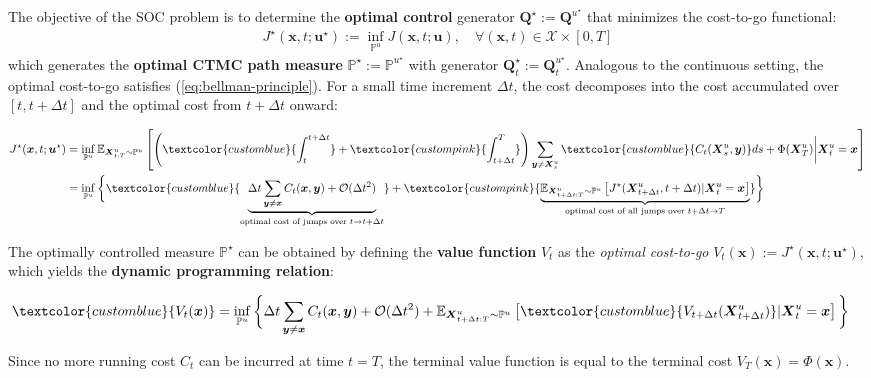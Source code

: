 \documentclass{article}
\newcommand{\boldtext}[1]{\textbf{\textcolor{MyGreen}{#1}}}
\newcommand{\bluetext}[1]{\textcolor{customblue}{#1}}
\newcommand{\pinktext}[1]{\textcolor{custompink}{#1}}
\begin{document}
The objective of the SOC problem is to determine the \boldtext{optimal control} generator $\boldsymbol{Q}^\star:=\boldsymbol{Q}^{u^\star}$ that minimizes the cost-to-go functional:
\begin{align}
    J^\star(\boldsymbol{x},t;\boldsymbol{u}^\star):= \inf_{\mathbb{P}^u}J(\boldsymbol{x},t;\boldsymbol{u}), \quad \forall (\boldsymbol{x},t)\in \mathcal{X}\times[0,T]
\end{align}
which generates the \textbf{optimal CTMC path measure} $\mathbb{P}^\star:= \mathbb{P}^{u^\star}$ with generator $\boldsymbol{Q}^\star_t:=\boldsymbol{Q}^{u^\star}_t$. Analogous to the continuous setting, the optimal cost-to-go satisfies (\ref{eq:bellman-principle}). For a small time increment $\Delta t$, the cost decomposes into the cost accumulated over $[t,t+\Delta t]$ and the optimal cost from $t+\Delta t$ onward:
\begin{small}
\begin{align}
    J^\star(\boldsymbol{x},t;\boldsymbol{u}^\star)&=\inf_{\mathbb{P}^u}\mathbb{E}_{\boldsymbol{X}^u_{t:T}\sim \mathbb{P}^u}\left[\left(\bluetext{\int_t^{t+\Delta t}}+\pinktext{\int_{t+\Delta t}^T}\right)\sum_{\boldsymbol{y}\neq \boldsymbol{X}^u_s}\bluetext{C_t(\boldsymbol{X}^u_s,\boldsymbol{y})}ds +\Phi(\boldsymbol{X}^u_T)\bigg|\boldsymbol{X}^u_t=\boldsymbol{x}\right]\nonumber\\
    &=\inf_{\mathbb{P}^u}\bigg\{\bluetext{\underbrace{\Delta t\sum_{\boldsymbol{y}\neq \boldsymbol{x}}C_t(\boldsymbol{x}, \boldsymbol{y})+\mathcal{O}(\Delta t^2)}_{\text{optimal cost of jumps over }t\to t+\Delta t}}+\pinktext{\underbrace{\mathbb{E}_{\boldsymbol{X}^u_{t+\Delta t:T}\sim \mathbb{P}^u}\left[J^\star(\boldsymbol{X}^u_{t+\Delta t},t+\Delta t)|\boldsymbol{X}^u_t=\boldsymbol{x}\right]}_{\text{optimal cost of all jumps over }t+\Delta t\to T}}\bigg\}\label{eq:ctmc-soc-prob}
\end{align}
\end{small}
The optimally controlled measure $\mathbb{P}^\star$ can be obtained by defining the \textbf{value function} $V_t$ as the \textit{optimal cost-to-go} $V_t(\boldsymbol{x}):=J^\star(\boldsymbol{x},t;\boldsymbol{u}^\star)$, which yields the \textbf{dynamic programming relation}:
\begin{small}
\begin{align}
    \bluetext{V_t(\boldsymbol{x})}&=\inf_{\mathbb{P}^u}\bigg\{\Delta t\sum_{\boldsymbol{y}\neq \boldsymbol{x}}C_t(\boldsymbol{x}, \boldsymbol{y})+\mathcal{O}(\Delta t^2)+\mathbb{E}_{\boldsymbol{X}^u_{t+\Delta t:T}\sim \mathbb{P}^u}\left[\bluetext{V_{t+\Delta t}(\boldsymbol{X}^u_{t+\Delta t})}|\boldsymbol{X}^u_t=\boldsymbol{x}\right]\bigg\}\label{eq:ctmc-value-func}
\end{align}
\end{small}
Since no more running cost $C_t$ can be incurred at time $t=T$, the terminal value function is equal to the terminal cost $V_T(\boldsymbol{x})=\Phi(\boldsymbol{x})$. 
\end{document}
